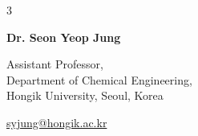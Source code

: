 \documentclass[11pt, a4paper]{article}
\newenvironment{threecolentryref}[3][]{
    \onecolentry
    \def\thirdColumn{#3}
    \setcolumnwidth{4.2cm, \fill, 4.2 cm}
    \begin{paracol}{3}
    {\raggedright #2} \switchcolumn
}{
    \switchcolumn \raggedleft \thirdColumn
    \end{paracol}
    \endonecolentry
} %
\let\hrefWithoutArrow\href
\begin{document}
        \vspace{0.3cm}

        \begin{threecolentryref}
            {\textbf{Dr. Seon Yeop Jung}}
            {\hrefWithoutArrow{syjung@hongik.ac.kr}{syjung@hongik.ac.kr}}
            {Assistant Professor,\\Department of Chemical Engineering,\\Hongik University, Seoul, Korea}
        \end{threecolentryref}





        
    


    
\end{document}
